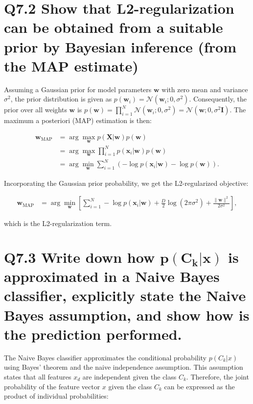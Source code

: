 \documentclass[11pt]{article}
\begin{document}
\section{Q7.2 Show that L2-regularization can be obtained from a suitable prior by Bayesian inference (from the MAP estimate)}

Assuming a Gaussian prior for model parameters $\mathbf{w}$ with zero mean and variance $\sigma^2$, the prior distribution is given as $p(\mathbf{w}_i) = \mathcal{N}(\mathbf{w}_i; 0, \sigma^2)$. Consequently, the prior over all weights $\mathbf{w}$ is $p(\mathbf{w}) = \prod_{i=1}^N \mathcal{N}(\mathbf{w}_i; 0, \sigma^2) = \mathcal{N}(\mathbf{w}; 0, \sigma^2 \mathbf{I})$. The maximum a posteriori (MAP) estimation is then:

\begin{align*}
\mathbf{w}_{\text{MAP}} &= \arg \max_{\mathbf{w}} p(\mathbf{X} | \mathbf{w})p(\mathbf{w}) \\
&= \arg \max_{\mathbf{w}} \prod_{i=1}^N p(\mathbf{x}_i | \mathbf{w})p(\mathbf{w}) \\
&= \arg \min_{\mathbf{w}} \sum_{i=1}^N \left( -\log p(\mathbf{x}_i | \mathbf{w}) - \log p(\mathbf{w}) \right).
\end{align*}

Incorporating the Gaussian prior probability, we get the L2-regularized objective:

\begin{align*}
\mathbf{w}_{\text{MAP}} &= \arg \min_{\mathbf{w}} \left[ \sum_{i=1}^N -\log p(\mathbf{x}_i | \mathbf{w}) + \frac{D}{2} \log(2\pi\sigma^2) + \frac{\| \mathbf{w} \|^2}{2\sigma^2} \right],
\end{align*}

which is the L2-regularization term.

\section{Q7.3 Write down how $\mathbf{p(C_k|x)}$ is approximated in a Naive Bayes classifier, explicitly state the Naive Bayes assumption, and show how is the prediction performed.}

The Naive Bayes classifier approximates the conditional probability \( p(C_k | x) \) using Bayes' theorem and the naive independence assumption. This assumption states that all features \( x_d \) are independent given the class \( C_k \). Therefore, the joint probability of the feature vector \( x \) given the class \( C_k \) can be expressed as the product of individual probabilities:
\end{document}
